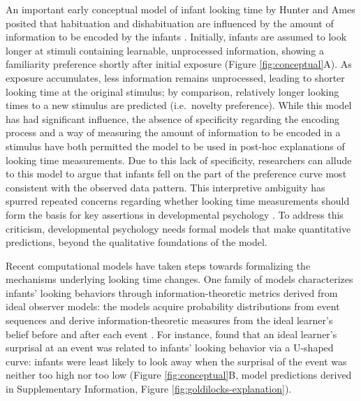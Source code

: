 \documentclass[
]{article}
\begin{document}
An important early conceptual model of infant looking time by Hunter and Ames posited that habituation and dishabituation are influenced by the amount of information to be encoded by the infants \autocite{hunter1988multifactor}. Initially, infants are assumed to look longer at stimuli containing learnable, unprocessed information, showing a familiarity preference shortly after initial exposure (Figure \ref{fig:conceptual}A). As exposure accumulates, less information remains unprocessed, leading to shorter looking time at the original stimulus; by comparison, relatively longer looking times to a new stimulus are predicted (i.e.~novelty preference). While this model has had significant influence, the absence of specificity regarding the encoding process and a way of measuring the amount of information to be encoded in a stimulus have both permitted the model to be used in post-hoc explanations of looking time measurements. Due to this lack of specificity, researchers can allude to this model to argue that infants fell on the part of the preference curve most consistent with the observed data pattern. This interpretive ambiguity has spurred repeated concerns regarding whether looking time measurements should form the basis for key assertions in developmental psychology \autocite{blumberg2023protracted,haith1998put,paulus2022should}. To address this criticism, developmental psychology needs formal models that make quantitative predictions, beyond the qualitative foundations of the \textcite{hunter1988multifactor} model.

Recent computational models have taken steps towards formalizing the mechanisms underlying looking time changes. One family of models characterizes infants' looking behaviors through information-theoretic metrics derived from ideal observer models: the models acquire probability distributions from event sequences and derive information-theoretic measures from the ideal learner's belief before and after each event \autocite{kidd2012goldilocks,poli2020infants,poli2023eight}. For instance, \textcite{kidd2012goldilocks} found that an ideal learner's surprisal at an event was related to infants' looking behavior via a U-shaped curve: infants were least likely to look away when the surprisal of the event was neither too high nor too low (Figure \ref{fig:conceptual}B, model predictions derived in Supplementary Information, Figure \ref{fig:goldilocks-explanation}).
\end{document}
